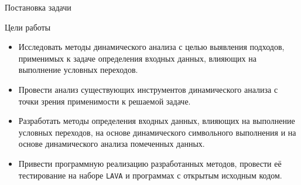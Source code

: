 \documentclass[10pt]{beamer}
\begin{document}
\begin{frame}{Постановка задачи}

Цели работы
\begin{itemize}
    \item Исследовать методы динамического анализа с целью выявления подходов, применимых к задаче определения входных данных, влияющих на выполнение условных переходов.
    \item Провести анализ существующих инструментов динамического анализа с точки зрения применимости к решаемой задаче.
    \item Разработать методы определения входных данных, влияющих на выполнение условных переходов, на основе динамического символьного выполнения и на основе динамического анализа помеченных данных.
    \item Привести программную реализацию разработанных методов, провести её тестирование на наборе \texttt{LAVA} и программах с открытым исходным кодом.
\end{itemize}



\end{frame}
\end{document}
